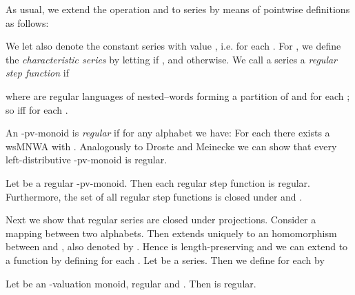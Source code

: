 \documentclass[runningheads, envcountsame, a4paper]{llncs}
\begin{document}
As usual, we extend the operation  and  to series  by means of pointwise definitions as follows:

We let  also denote the constant series with value , i.e.  for each .
For , we define the \emph{characteristic series}  by letting  if , and  otherwise.
We call a series  a \emph{regular step function} if

where  are regular languages of nested--words
	forming a partition of  and  for each ; so
	 iff 
	for each .
\par
An -pv-monoid  is \emph{regular} if for any alphabet  we have: For each  there exists a wsMNWA  with . Analogously to Droste and Meinecke \cite{DM} we can show that every left-distributive -pv-monoid is regular. \begin{Satz}
\label{rsfreg}
	Let  be a regular -pv-monoid. Then each regular step function  is regular. Furthermore, the set of all regular step functions is closed under  and .
\end{Satz}
Next we show that regular series are closed under projections. Consider a mapping  between two alphabets. Then  extends uniquely to an homomorphism between  and , also denoted by . Hence  is length-preserving and we can extend  to a function  by defining  for each .
Let  be a series. Then we define  for each  by

\begin{Satz}
	\label{hom}
	Let  be an -valuation monoid,  regular and . Then  is regular.
\end{Satz}
\end{document}
